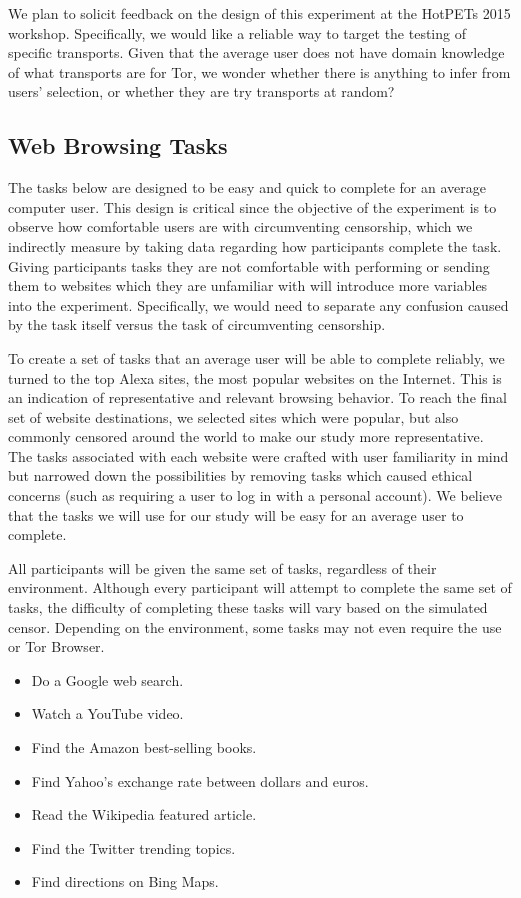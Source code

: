 \documentclass[letterpaper,twocolumn,11pt]{article}
\begin{document}
We plan to solicit feedback on the design of this experiment at the HotPETs 2015 workshop.
Specifically, we would like a reliable way to target the testing of 
specific transports. Given that the average user does not have domain knowledge of 
what transports are for Tor, we wonder whether there is anything to infer from users' selection,
or whether they are try transports at random?

\subsection{Web Browsing Tasks}
\indent \indent The tasks below are designed to be easy and quick to complete for an average
computer user. This design is critical since the objective of the experiment is to observe
how comfortable users are with circumventing censorship, which we indirectly measure
by taking data regarding how participants complete the task. Giving participants tasks 
they are not comfortable with performing or sending them to websites which they are 
unfamiliar with will introduce more variables into the experiment. 
Specifically, we would need to separate any confusion caused by the task itself versus
the task of circumventing censorship. 

To create a set of tasks that an average user will be able to complete reliably, 
we turned to the top Alexa sites, the most popular websites on the Internet. This 
is an indication of representative and relevant browsing behavior. To reach the final
set of website destinations, we selected sites which were popular, but also commonly
censored around the world to make our study more representative. The tasks 
associated with each website were crafted with user familiarity in mind but narrowed 
down the possibilities by removing tasks which caused ethical concerns (such as 
requiring a user to log in with a personal account).  
We believe that the tasks we will use for our study will be easy for an average 
user to complete.

All participants will be given the same set of tasks, regardless of their environment.  
Although every participant will attempt to complete the same 
set of tasks, the difficulty of completing these tasks will vary based on the simulated censor.
Depending on the environment, some tasks may not even require the use or Tor Browser. 

\begin{itemize} \itemsep1pt \parskip0pt 
\item Do a Google web search.
\item Watch a YouTube video.
\item Find the Amazon best-selling books.
\item Find Yahoo's exchange rate between dollars and euros.
\item Read the Wikipedia featured article.
\item Find the Twitter trending topics.
\item Find directions on Bing Maps.
\end{itemize}
\end{document}

